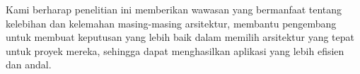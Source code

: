 \documentclass[conference]{IEEEtran}
\begin{document}
	Kami berharap penelitian ini memberikan wawasan yang bermanfaat tentang kelebihan dan kelemahan masing-masing arsitektur, membantu pengembang untuk membuat keputusan yang lebih baik dalam memilih arsitektur yang tepat untuk proyek mereka, sehingga dapat menghasilkan aplikasi yang lebih efisien dan andal.
	
	
	\vspace{12pt}
	
\end{document}

